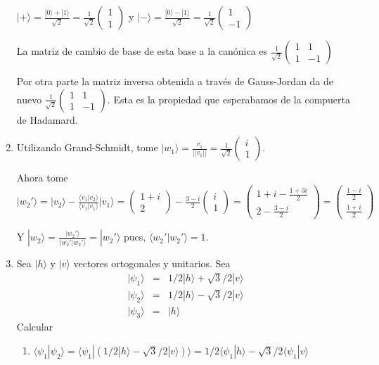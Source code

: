\documentclass[letter,twoside,12pt]{article}
\begin{document}
\begin{enumerate}
$ |+ \rangle = \frac{|0 \rangle + |1 \rangle}{\sqrt{2}} = \frac{1}{\sqrt{2}}
\begin{pmatrix}
1
\\1
\end{pmatrix} $ y $ |- \rangle = \frac{|0 \rangle - |1 \rangle}{\sqrt{2}} = \frac{1}{\sqrt{2}}
\begin{pmatrix}
1
\\-1
\end{pmatrix} $

La matriz de cambio de base de esta base a la canónica es
$ \frac{1}{\sqrt{2}}\begin{pmatrix}
1 &  1
\\ 1 & -1
\end{pmatrix}
 $
 
Por otra parte la matriz inversa obtenida a través de Gauss-Jordan da de nuevo $ \frac{1}{\sqrt{2}}\begin{pmatrix}
1 &  1
\\ 1 & -1
\end{pmatrix}
 $. Esta es la propiedad que esperabamos de la compuerta de Hadamard.
\item Utilizando Grand-Schmidt, tome $ |w_1 \rangle = \frac{v_1}{||v_1||} = \frac{1}{\sqrt{2}}\begin{pmatrix}
i
\\ 1
\end{pmatrix} $.

Ahora tome $ |w_2' \rangle = |v_2 \rangle - \frac{\langle v_1 | v_2 \rangle}{\langle v_1 | v_1 \rangle} | v_1 \rangle = \begin{pmatrix}
1+i 
\\ 2
\end{pmatrix}-\frac{3-i}{2}\begin{pmatrix}
i 
\\ 1
\end{pmatrix} = \begin{pmatrix}
1+i-\frac{1+3i}{2} 
\\ 2-\frac{3-i}{2}
\end{pmatrix} = \begin{pmatrix}
\frac{1-i}{2} 
\\ \frac{1+i}{2}
\end{pmatrix}$

Y $ |w_2 \rangle = \frac{|w_2 ' \rangle}{\langle w_2' | w_2' \rangle} = |w_2' \rangle$ pues, $ \langle w_2' | w_2' \rangle = 1$.  

\item Sea $ |h \rangle $ y $ |v \rangle $ vectores ortogonales y unitarios. Sea
\begin{eqnarray}
|\psi_1 \rangle &=& 1/2|h \rangle + \sqrt{3}/2 | v \rangle \nonumber
\\|\psi_2 \rangle &=& 1/2|h \rangle - \sqrt{3}/2 | v \rangle \nonumber
\\|\psi_3 \rangle &=& |h \rangle \nonumber
\end{eqnarray} 
Calcular 
\begin{enumerate}
\item $ \langle \psi_1 | \psi_2 \rangle = \langle \psi_1 | (1/2|h \rangle - \sqrt{3}/2 | v \rangle) \rangle = 1/2 \langle \psi_1 | h \rangle - \sqrt{3}/2\langle \psi_1 | v \rangle $


\end{enumerate}
\end{enumerate}
\end{document}

